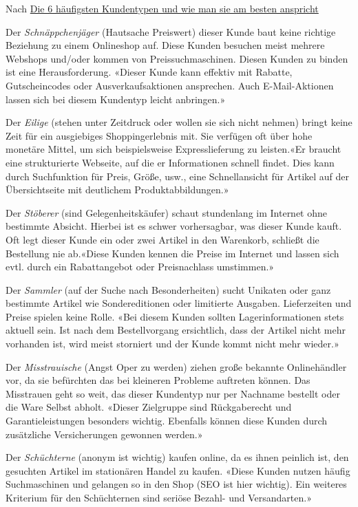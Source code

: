 Nach \href{https://www.businessinsider.de/gruenderszene/allgemein/kundentypen-comarch}{Die 6 häufigsten Kundentypen und wie man sie am besten anspricht}\vspace{0.2cm}

Der \textit{Schnäppchenjäger} (Hautsache Preiswert) dieser Kunde baut keine richtige Beziehung  zu einem Onlineshop auf. Diese Kunden besuchen meist mehrere Webshops und/oder kommen von Preissuchmaschinen. Diesen Kunden zu binden ist eine Herausforderung. «Dieser Kunde kann effektiv mit Rabatte, Gutscheincodes oder Ausverkaufsaktionen ansprechen. Auch E-Mail-Aktionen lassen sich bei diesem Kundentyp leicht anbringen.»\vspace{0.2cm}

Der \textit{Eilige} (stehen unter Zeitdruck oder wollen sie sich nicht nehmen) bringt keine Zeit für ein ausgiebiges Shoppingerlebnis mit. Sie verfügen oft über hohe monetäre Mittel, um sich beispielsweise Expresslieferung zu leisten.«Er braucht eine strukturierte Webseite, auf die er Informationen schnell findet. Dies kann durch Suchfunktion für Preis, Größe, usw., eine Schnellansicht für Artikel auf der Übersichtseite mit deutlichem Produktabbildungen.»\vspace{0.2cm}

Der \textit{Stöberer} (sind Gelegenheitskäufer) schaut stundenlang im Internet ohne bestimmte Absicht. Hierbei ist es schwer vorhersagbar, was dieser Kunde kauft. Oft legt dieser Kunde ein oder zwei Artikel in den Warenkorb, schließt die Bestellung nie ab.«Diese Kunden kennen die Preise im Internet und lassen sich evtl. durch ein Rabattangebot oder Preisnachlass umstimmen.»\vspace{0.2cm}

Der \textit{Sammler} (auf der Suche nach Besonderheiten) sucht Unikaten oder ganz bestimmte Artikel wie Sondereditionen oder limitierte Ausgaben. Lieferzeiten und Preise spielen keine Rolle. «Bei diesem Kunden sollten Lagerinformationen stets aktuell sein. Ist nach dem Bestellvorgang ersichtlich, dass der Artikel nicht mehr vorhanden ist, wird meist storniert und der Kunde kommt nicht mehr wieder.»\vspace{0.2cm}

Der \textit{Misstrauische} (Angst Oper zu werden) ziehen große bekannte Onlinehändler vor, da sie befürchten das bei kleineren Probleme auftreten können. Das Misstrauen geht so weit, das dieser Kundentyp nur per Nachname bestellt oder die Ware Selbst abholt. «Dieser Zielgruppe sind Rückgaberecht und Garantieleistungen besonders wichtig. Ebenfalls können diese Kunden durch zusätzliche Versicherungen gewonnen werden.»\vspace{0.2cm}

Der \textit{Schüchterne} (anonym ist wichtig) kaufen online, da es ihnen peinlich ist, den gesuchten Artikel im stationären Handel zu kaufen. «Diese Kunden nutzen häufig Suchmaschinen und gelangen so in den Shop (SEO ist hier wichtig). Ein weiteres Kriterium für den Schüchternen sind seriöse Bezahl- und Versandarten.»